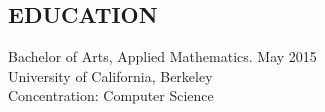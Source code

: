 \documentclass[resmargin, 6pt]{res} %
\begin{document}
\begin{resume}

 



\section{EDUCATION}

Bachelor of Arts, Applied Mathematics. May 2015\\
University of California, Berkeley \\
Concentration: Computer Science\\
 


 
 

\end{resume}
\end{document}
